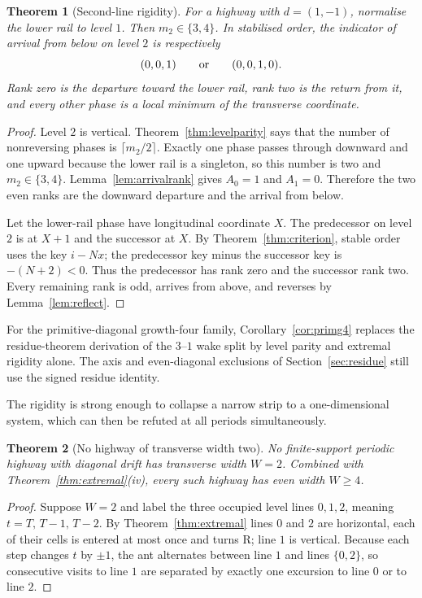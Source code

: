 \documentclass[11pt,letterpaper]{article}
\theoremstyle{plain}
\newtheorem{theorem}{Theorem}[section]
\theoremstyle{definition}
\newcommand{\drift}{d}
\newcommand{\turnR}{\mathrm{R}}
\begin{document}
\begin{NoHyper}
\begin{theorem}[Second-line rigidity]\label{thm:secondline}
For a highway with $\drift=(1,-1)$, normalise the lower rail to level $1$.
Then $m_2\in\{3,4\}$.  In stabilised order, the indicator of arrival from below
on level $2$ is respectively
\[
(0,0,1)\qquad\hbox{or}\qquad(0,0,1,0).
\]
Rank zero is the departure toward the lower rail, rank two is the return from
it, and every other phase is a local minimum of the transverse coordinate.
\end{theorem}

\begin{proof}
Level $2$ is vertical.  Theorem~\ref{thm:levelparity} says that the number of
nonreversing phases is $\lceil m_2/2\rceil$.  Exactly one phase passes through
downward and one upward because the lower rail is a singleton, so this number
is two and $m_2\in\{3,4\}$.  Lemma~\ref{lem:arrivalrank} gives $A_0=1$ and
$A_1=0$.  Therefore the two even ranks are the downward departure and the
arrival from below.

Let the lower-rail phase have longitudinal coordinate $X$.  The predecessor
on level $2$ is at $X+1$ and the successor at $X$.  By
Theorem~\ref{thm:criterion}, stable order uses the key $i-Nx$; the predecessor key minus
the successor key is $-(N+2)<0$.  Thus the predecessor has rank zero and the
successor rank two.  Every remaining rank is odd, arrives from above, and
reverses by Lemma~\ref{lem:reflect}.
\end{proof}

For the primitive-diagonal growth-four family, Corollary~\ref{cor:primg4} replaces
the residue-theorem derivation of the $3$--$1$ wake split by level parity and
extremal rigidity alone. The axis and even-diagonal exclusions of
Section~\ref{sec:residue} still use the signed residue identity.

The rigidity is strong enough to collapse a narrow strip to a one-dimensional system,
which can then be refuted at all periods simultaneously.

\begin{theorem}[No highway of transverse width two]\label{thm:width2}
No finite-support periodic highway with diagonal drift has transverse width $W=2$.
Combined with Theorem~\ref{thm:extremal}(iv), every such highway has even width
$W\ge4$.
\end{theorem}

\begin{proof}
Suppose $W=2$ and label the three occupied level lines $0,1,2$, meaning $t=T,\,T-1,\,
T-2$. By Theorem~\ref{thm:extremal} lines $0$ and $2$ are horizontal, each of their
cells is entered at most once and turns $\turnR$; line $1$ is vertical. Because each
step changes $t$ by $\pm1$, the ant alternates between line $1$ and lines $\{0,2\}$,
so consecutive visits to line $1$ are separated by exactly one excursion to line $0$
or to line $2$.


\end{proof}
\end{NoHyper}
\end{document}
